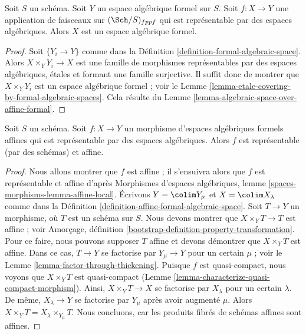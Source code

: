 \begin{lemma}
\label{lemma-representable-by-algebraic-spaces}
Soit $S$ un schéma. Soit $Y$ un espace algébrique formel sur $S$.
Soit $f : X \to Y$ une application de faisceaux sur $(\Sch/S)_{fppf}$ qui est
représentable par des espaces algébriques. Alors $X$ est un espace
algébrique formel.
\end{lemma}

\begin{proof}
Soit $\{Y_i \to Y\}$ comme dans la
Définition \ref{definition-formal-algebraic-space}.
Alors $X \times_Y Y_i \to X$ est une famille de morphismes
représentables par des espaces algébriques, étales et formant une famille
surjective. Il suffit donc de montrer que
$X \times_Y Y_i$ est un espace algébrique formel ; voir le
Lemme \ref{lemma-etale-covering-by-formal-algebraic-spaces}.
Cela résulte du Lemme \ref{lemma-algebraic-space-over-affine-formal}.
\end{proof}

\begin{lemma}
\label{lemma-affine-representable-by-algebraic-spaces}
Soit $S$ un schéma. Soit $f : X \to Y$ un morphisme
d'espaces algébriques formels affines qui est représentable par des
espaces algébriques. Alors $f$ est représentable (par des schémas) et affine.
\end{lemma}

\begin{proof}
Nous allons montrer que $f$ est affine ; il s'ensuivra alors que
$f$ est représentable et affine d'après
Morphismes d'espaces algébriques, lemme \ref{spaces-morphisms-lemma-affine-local}.
Écrivons $Y = \colim Y_\mu$ et $X = \colim X_\lambda$ comme dans la
Définition \ref{definition-affine-formal-algebraic-space}.
Soit $T \to Y$ un morphisme, où $T$ est un schéma
sur $S$. Nous devons montrer que $X \times_Y T \to T$ est affine ; voir
Amorçage, définition
\ref{bootstrap-definition-property-transformation}.
Pour ce faire, nous pouvons supposer $T$ affine et devons démontrer
que $X \times_Y T$ est affine. Dans ce cas, $T \to Y$ se factorise
par $Y_\mu \to Y$ pour un certain $\mu$ ; voir le
Lemme \ref{lemma-factor-through-thickening}.
Puisque $f$ est quasi-compact, nous voyons que $X \times_Y T$ est
quasi-compact (Lemme \ref{lemma-characterize-quasi-compact-morphism}).
Ainsi, $X \times_Y T \to X$ se factorise par $X_\lambda$ pour un certain
$\lambda$. De même, $X_\lambda \to Y$ se factorise par $Y_\mu$
après avoir augmenté $\mu$. Alors
$X \times_Y T = X_\lambda \times_{Y_\mu} T$.
Nous concluons, car les produits fibrés de schémas affines sont affines.
\end{proof}

